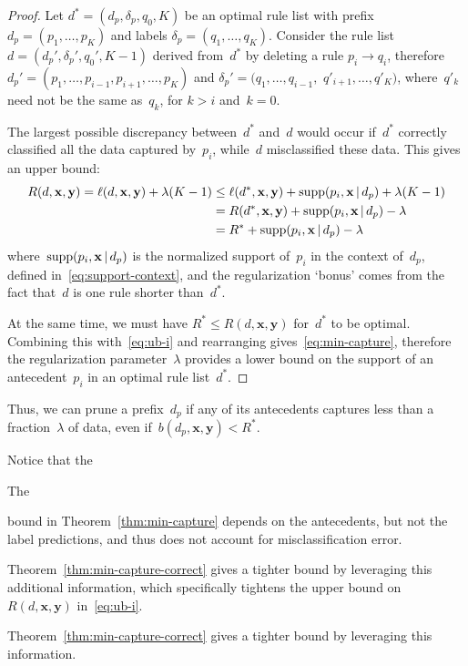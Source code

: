 \documentclass[twoside,11pt]{article}
\newcommand{\x}{\mathbf{x}}
\newcommand{\y}{\mathbf{y}}
\def\RL{{d}}
\def\Prefix{d_p}
\def\Labels{\delta_p}
\def\Default{q_0}
\def\Obj{R}
\def\Loss{\ell}
\def\Reg{{\lambda}}
\def\Supp{\textnormal{supp}}
\def\OptimalObj{R^*}
\def\OptimalRL{d^*}
\newcommand{\nn}{\nonumber}
\newcommand{\given}{\,|\,}
\begin{document}
\begin{arxiv}
\begin{proof}
Let ${\OptimalRL = (\Prefix, \Labels, \Default, K)}$ be an optimal
rule list with prefix ${\Prefix = (p_1, \dots, p_K)}$
and labels ${\Labels = (q_1, \dots, q_K)}$.
%
Consider the rule list ${\RL = (\Prefix', \Labels', \Default', K-1)}$
derived from~$\OptimalRL$ by deleting a rule ${p_i \rightarrow q_i}$,
therefore ${\Prefix' = (p_1, \dots, p_{i-1}, p_{i+1}, \dots, p_K)}$
and ${\Labels' = (q_1, \dots, q_{i-1},}$ ${q'_{i+1}, \dots, q'_K)}$,
where~$q'_k$ need not be the same as~$q_k$, for ${k > i}$ and~${k = 0}$.

The largest possible discrepancy between~$\OptimalRL$ and~$\RL$ would occur
if~$\OptimalRL$ correctly classified all the data captured by~$p_i$,
while~$\RL$ misclassified these data.
%
This gives an upper bound:
\begin{align}
\Obj(\RL, \x, \y) = \Loss(\RL, \x, \y) + \Reg (K - 1)
&\le \Loss(\OptimalRL, \x, \y) + \Supp(p_i, \x \given \Prefix) + \Reg(K - 1) \nn \\
&= \Obj(\OptimalRL, \x, \y) + \Supp(p_i, \x \given \Prefix) - \Reg \nn \\
&= \OptimalObj + \Supp(p_i, \x \given \Prefix) - \Reg
\label{eq:ub-i}
\end{align}
where~$\Supp(p_i, \x \given \Prefix)$ is the normalized support of~$p_i$
in the context of~$\Prefix$, defined in~\eqref{eq:support-context},
and the regularization `bonus' comes from the fact that~$\RL$
is one rule shorter than~$\OptimalRL$.

At the same time, we must have ${\OptimalObj \le \Obj(\RL, \x, \y)}$ for~$\OptimalRL$ to be optimal.
%
Combining this with~\eqref{eq:ub-i} and rearranging gives~\eqref{eq:min-capture},
therefore the regularization parameter~$\Reg$ provides a lower bound
on the support of an antecedent~$p_i$ in an optimal rule list~$\OptimalRL$.
\end{proof}
\end{arxiv}

Thus, we can prune a prefix~$\Prefix$ if any of its antecedents captures less than
a fraction~$\Reg$ of data, even if~${b(\Prefix, \x, \y) < \OptimalObj}$.
%
\begin{arxiv}
Notice that the
\end{arxiv}
\begin{kdd}
The
\end{kdd}
bound in Theorem~\ref{thm:min-capture}
depends on the antecedents, but not the label predictions,
and thus does not account for misclassification error.
%
\begin{arxiv}
Theorem~\ref{thm:min-capture-correct} gives a tighter bound
by leveraging this additional information, which specifically
tightens the upper bound on~$\Obj(\RL, \x, \y)$ in~\eqref{eq:ub-i}.
\end{arxiv}
\begin{kdd}
Theorem~\ref{thm:min-capture-correct} gives a tighter bound
by leveraging this information.
\end{kdd}
\end{document}
